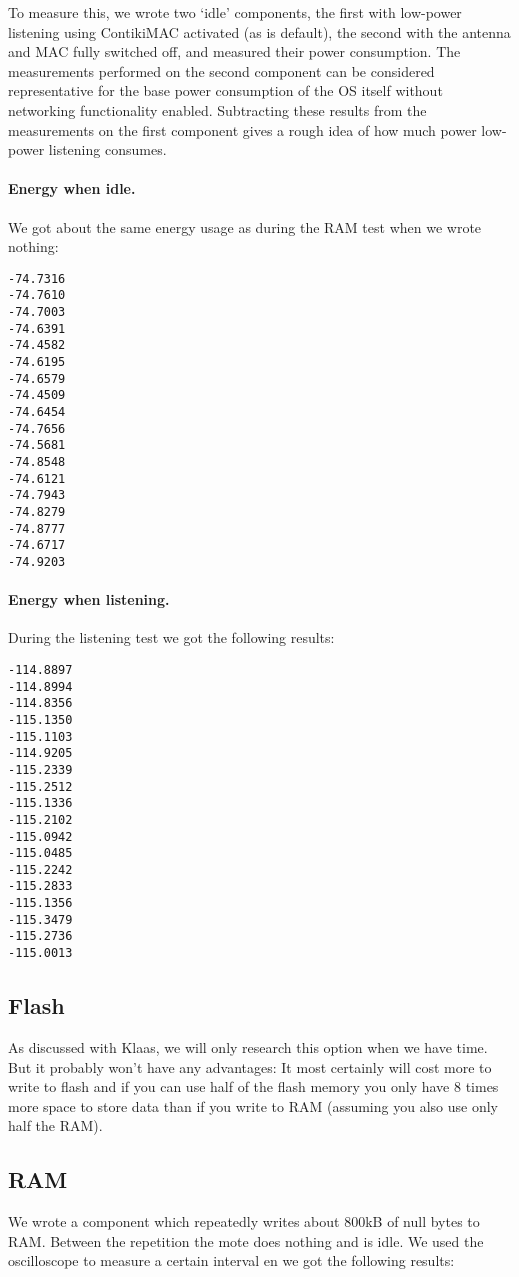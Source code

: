 \documentclass{article} \usepackage[utf8]{inputenc}
\begin{document}
To measure this, we wrote two `idle' components, the first with
low-power listening using ContikiMAC activated (as is default), the
second with the antenna and MAC fully switched off, and measured their
power consumption. The measurements performed on the second component
can be considered representative for the base power consumption of the
OS itself without networking functionality enabled. Subtracting these
results from the measurements on the first component gives a rough
idea of how much power low-power listening consumes.

\paragraph{Energy when idle.}
We got about the same energy usage as during the RAM test when we
wrote nothing:

\begin{verbatim}
-74.7316
-74.7610
-74.7003
-74.6391
-74.4582
-74.6195
-74.6579
-74.4509
-74.6454
-74.7656
-74.5681
-74.8548
-74.6121
-74.7943
-74.8279
-74.8777
-74.6717
-74.9203
\end{verbatim}


\paragraph{Energy when listening.}
During the listening test we got the following results:

\begin{verbatim}
-114.8897
-114.8994
-114.8356
-115.1350
-115.1103
-114.9205
-115.2339
-115.2512
-115.1336
-115.2102
-115.0942
-115.0485
-115.2242
-115.2833
-115.1356
-115.3479
-115.2736
-115.0013
\end{verbatim}

\subsection{Flash}
As discussed with Klaas, we will only research this option when we
have time. But it probably won't have any advantages: It most
certainly will cost more to write to flash and if you can use half of
the flash memory you only have 8 times more space to store data than
if you write to RAM (assuming you also use only half the RAM).

\subsection{RAM}

We wrote a component which repeatedly writes about 800kB of null bytes
to RAM. Between the repetition the mote does nothing and is idle. We
used the oscilloscope to measure a certain interval en we got the
following results:
\end{document}
